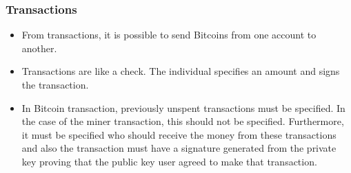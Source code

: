 \documentclass{beamer}
\begin{document}
\begin{frame}
   \frametitle{Transactions}
   \begin{itemize}
     \item From transactions, it is possible to send Bitcoins from one account to another.
     \item Transactions are like a check. The individual specifies an amount and signs the transaction.
     \item In Bitcoin transaction, previously unspent transactions must be specified.
       In the case of the miner transaction, this should not be specified.
       Furthermore, it must be specified who should receive the money from these transactions and
       also the transaction must have a signature generated from the private key proving
       that the public key user agreed to make that transaction.
   \end{itemize}
\end{frame}
\end{document}
